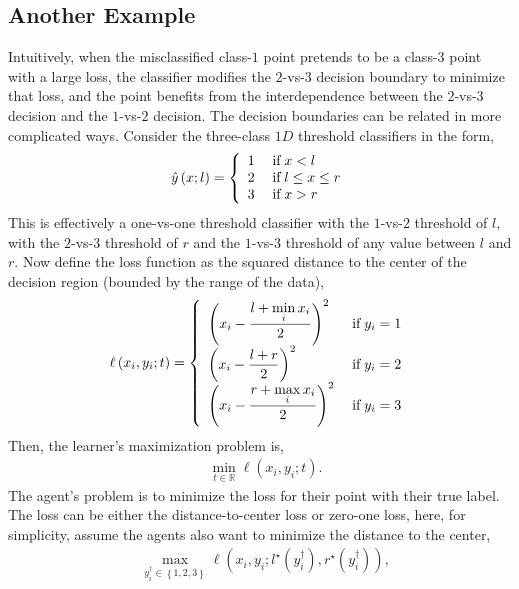 \documentclass{article}
\begin{document}
\subsection{Another Example}

Intuitively, when the misclassified class-$1$ point pretends to be a class-$3$ point with a large loss, the classifier modifies the $2$-vs-$3$ decision boundary to minimize that loss, and the point benefits from the interdependence between the $2$-vs-$3$ decision and the $1$-vs-$2$ decision.
\newline \newline
The decision boundaries can be related in more complicated ways. Consider the three-class $1D$ threshold classifiers in the form,
\[ \hat{y}\left(x; l\right) =\left\{ \begin{array}{ll}
1& \text{\;if\;} x < l \\
2& \text{\;if\;} l \leq  x \leq  r \\
3& \text{\;if\;} x > r \\
\end{array}\right. \]
This is effectively a one-vs-one threshold classifier with the $1$-vs-$2$ threshold of $l $, with the $2$-vs-$3$ threshold of $r $ and the $1$-vs-$3$ threshold of any value between $l $ and $r $. Now define the loss function as the squared distance to the center of the decision region (bounded by the range of the data),
\[ \ell\left(x_{i}, y_{i}; t\right) =\left\{ \begin{array}{ll}
\left(x_{i} - \dfrac{l + \displaystyle\min_{i} x_{i}}{2}\right)^{2}& \text{\;if\;} y_{i} = 1 \\
\left(x_{i} - \dfrac{l + r}{2}\right)^{2}& \text{\;if\;} y_{i} = 2 \\
\left(x_{i} - \dfrac{r + \displaystyle\max_{i} x_{i}}{2}\right)^{2}& \text{\;if\;} y_{i} = 3 \\
\end{array}\right. \]
Then, the learner's maximization problem is,
\begin{align*}
&\displaystyle\min_{t \in \mathbb{R}} \ell\left(x_{i}, y_{i}; t\right).
\end{align*}
The agent's problem is to minimize the loss for their point with their true label. The loss can be either the distance-to-center loss or zero-one loss, here, for simplicity, assume the agents also want to minimize the distance to the center,
\begin{align*}
&\displaystyle\max_{y^{\dagger}_{i} \in \left\{1, 2, 3\right\}} \ell\left(x_{i}, y_{i}; l^\star \left(y^{\dagger}_{i}\right), r^\star \left(y^{\dagger}_{i}\right)\right),
\end{align*}
\end{document}
